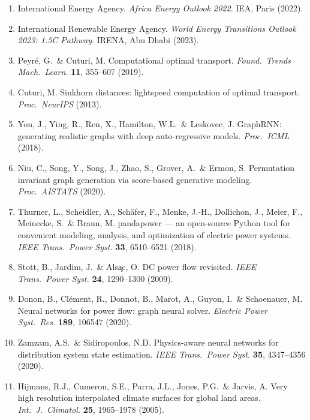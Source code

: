 \documentclass[10pt,a4paper]{article}
\begin{document}
\begin{enumerate}[label={\arabic*.}, leftmargin=*, itemsep=2pt, topsep=2pt]
\item International Energy Agency. \emph{Africa Energy Outlook
2022}. IEA, Paris (2022).

\item International Renewable Energy Agency. \emph{World Energy
Transitions Outlook 2023: 1.5\textdegree C Pathway}. IRENA, Abu
Dhabi (2023).

\item Peyr\'e, G.\ \& Cuturi, M. Computational optimal transport.
\emph{Found.\ Trends Mach.\ Learn.} \textbf{11}, 355--607 (2019).

\item Cuturi, M. Sinkhorn distances: lightspeed computation of
optimal transport. \emph{Proc.\ NeurIPS} (2013).

\item You, J., Ying, R., Ren, X., Hamilton, W.L.\ \& Leskovec, J.
GraphRNN: generating realistic graphs with deep auto-regressive
models. \emph{Proc.\ ICML} (2018).

\item Niu, C., Song, Y., Song, J., Zhao, S., Grover, A.\ \& Ermon,
S. Permutation invariant graph generation via score-based
generative modeling. \emph{Proc.\ AISTATS} (2020).

\item Thurner, L., Scheidler, A., Sch\"afer, F., Menke, J.-H.,
Dollichon, J., Meier, F., Meinecke, S.\ \& Braun, M. pandapower
--- an open-source Python tool for convenient modeling, analysis,
and optimization of electric power systems. \emph{IEEE Trans.\
Power Syst.} \textbf{33}, 6510--6521 (2018).

\item Stott, B., Jardim, J.\ \& Als\c{a}c, O. DC power flow
revisited. \emph{IEEE Trans.\ Power Syst.} \textbf{24}, 1290--1300
(2009).

\item Donon, B., Cl\'ement, R., Donnot, B., Marot, A., Guyon, I.\
\& Schoenauer, M. Neural networks for power flow: graph neural
solver. \emph{Electric Power Syst.\ Res.} \textbf{189}, 106547
(2020).

\item Zamzam, A.S.\ \& Sidiropoulos, N.D. Physics-aware neural
networks for distribution system state estimation. \emph{IEEE
Trans.\ Power Syst.} \textbf{35}, 4347--4356 (2020).

\item Hijmans, R.J., Cameron, S.E., Parra, J.L., Jones, P.G.\
\& Jarvis, A. Very high resolution interpolated climate surfaces
for global land areas. \emph{Int.\ J.\ Climatol.} \textbf{25},
1965--1978 (2005).


\end{enumerate}
\end{document}
